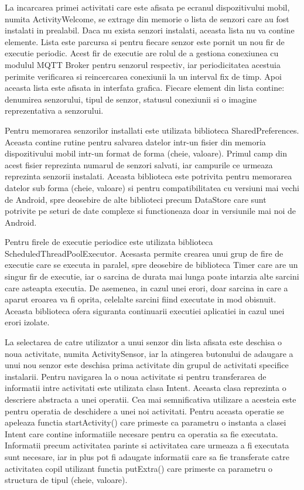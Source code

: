 La incarcarea primei activitati care este afisata pe ecranul dispozitivului mobil, numita ActivityWelcome, se extrage din memorie o lista de senzori care au fost 
instalati in prealabil. Daca nu exista senzori instalati, aceasta lista nu va contine elemente. Lista este parcursa si pentru fiecare senzor este pornit un nou 
fir de executie periodic. Acest fir de executie are rolul de a gestiona conexiunea cu modulul MQTT Broker pentru senzorul respectiv, iar periodicitatea 
acestuia perimite verificarea si reincercarea conexiunii la un interval fix de timp. Apoi aceasta lista este afisata in interfata grafica. Fiecare element din lista 
contine: denumirea senzorului, tipul de senzor, statusul conexiunii si o imagine reprezentativa a senzorului.

Pentru memorarea senzorilor installati este utilizata biblioteca SharedPreferences. Aceasta contine rutine pentru salvarea datelor intr-un fisier din memoria 
dispozitivului mobil intr-un format de forma (cheie, valoare). Primul camp din acest fisier reprezinta numarul de senzori salvati, iar campurile ce urmeaza 
reprezinta senzorii instalati. Aceasta biblioteca este potrivita pentru memorarea datelor sub forma (cheie, valoare) si pentru compatibilitatea cu versiuni mai 
vechi de Android, spre deosebire de alte biblioteci precum DataStore care sunt potrivite pe seturi de date complexe si functioneaza doar in versiunile mai noi de 
Android.

Pentru firele de executie periodice este utilizata biblioteca ScheduledThreadPoolExecutor. Acesasta permite crearea unui grup de fire de executie care se executa
in paralel, spre deosebire de biblioteca Timer care are un singur fir de executie, iar o sarcina de durata mai lunga poate intarzia alte sarcini care asteapta 
executia. De asemenea, in cazul unei erori, doar sarcina in care a aparut eroarea va fi oprita, celelalte sarcini fiind executate in mod obisnuit. Aceasta 
biblioteca ofera siguranta continuarii executiei aplicatiei in cazul unei erori izolate.

La selectarea de catre utilizator a unui senzor din lista afisata este deschisa o noua activitate, numita ActivitySensor, iar la atingerea butonului de adaugare a unui 
nou senzor este deschisa prima activitate din grupul de activitati specifice instalarii. Pentru navigarea la o noua activitate si pentru transferarea de informatii intre 
activitati este utilizata clasa Intent. Aceasta clasa reprezinta o descriere abstracta a unei operatii. Cea mai semnificativa utilizare a acesteia este pentru operatia de 
deschidere a unei noi activitati. Pentru aceasta operatie se apeleaza functia startActivity() care primeste ca parametru o instanta a clasei Intent care contine informatiile 
necesare pentru ca operatia sa fie executata. Informatii precum activitatea parinte si activitatea care urmeaza a fi executata sunt necesare, iar in plus pot fi adaugate 
informatii care sa fie transferate catre activitatea copil utilizant functia putExtra() care primeste ca parametru o structura de tipul (cheie, valoare).

